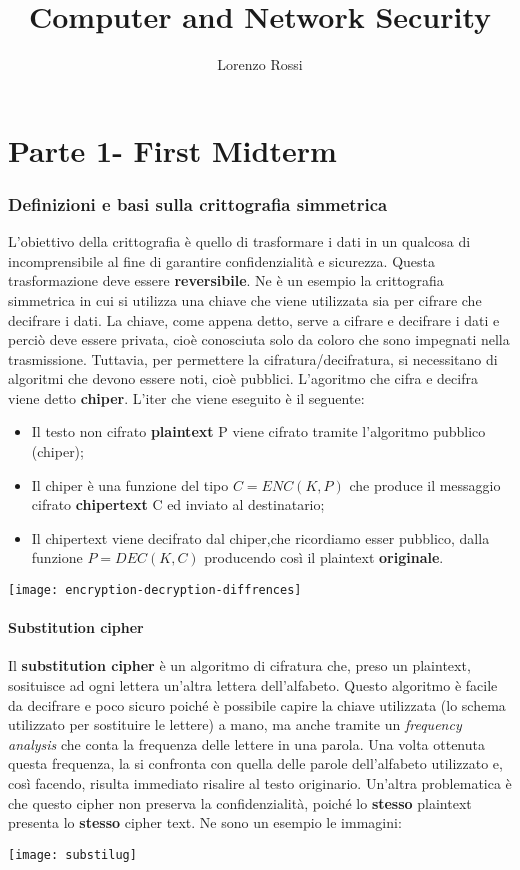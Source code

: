 \documentclass{article}
\title{Computer and Network Security}
\author{Lorenzo Rossi}
\theoremstyle{remark}
\begin{document}
\theoremstyle{definition}

\maketitle

\tableofcontents
\newpage
\part{Parte 1- First Midterm}
\section{Definizioni e basi sulla crittografia simmetrica}
L'obiettivo della crittografia è quello di trasformare i dati in un qualcosa di incomprensibile al fine di garantire confidenzialità e sicurezza. Questa trasformazione deve essere \textbf{reversibile}. Ne è un esempio la crittografia simmetrica in cui si utilizza una chiave che viene utilizzata sia per cifrare che decifrare i dati.
La chiave, come appena detto, serve a cifrare e decifrare i dati e perciò deve essere privata, cioè conosciuta solo da coloro che sono impegnati nella trasmissione. Tuttavia, per permettere la cifratura/decifratura, si necessitano di algoritmi che devono essere noti, cioè pubblici.
L'agoritmo che cifra e decifra viene detto \textbf{chiper}. L'iter che viene eseguito è il seguente:
\begin{itemize}
    \item Il testo non cifrato \textbf{plaintext} P viene cifrato tramite l'algoritmo pubblico (chiper);
    \item Il chiper è una funzione del tipo \(C=ENC(K,P)\) che produce il messaggio cifrato \textbf{chipertext} C ed inviato al destinatario;
    \item Il chipertext viene decifrato dal chiper,che ricordiamo esser pubblico, dalla funzione \(P=DEC(K,C)\) producendo così il plaintext \textbf{originale}.
\end{itemize}
\begin{center}
    \texttt{[image: encryption-decryption-diffrences]}
\end{center}
\subsection{Substitution cipher}
Il \textbf{substitution cipher} è un algoritmo di cifratura che, preso un plaintext, sosituisce ad ogni lettera un'altra lettera dell'alfabeto. Questo algoritmo è facile da decifrare e poco sicuro poiché è possibile capire la chiave utilizzata (lo schema utilizzato per sostituire le lettere) a mano, ma anche tramite un \emph{frequency analysis} che conta la frequenza delle lettere in una parola. Una volta ottenuta questa frequenza, la si confronta con quella delle parole dell'alfabeto utilizzato e, così facendo, risulta immediato risalire al testo originario.
Un'altra problematica è che questo cipher non preserva la confidenzialità, poiché lo \textbf{stesso} plaintext presenta lo \textbf{stesso} cipher text. Ne sono un esempio le immagini:
\begin{center}
    \texttt{[image: substilug]}
\end{center}
\end{document}
